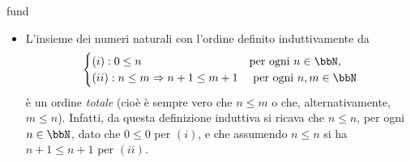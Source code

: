 \begin{hExamples}{fund}\leavevmode
	\begin{itemize}
		\item L'insieme dei numeri naturali con l'ordine definito induttivamente da
		      \[\begin{cases}
				      (i): 0\le n                         & \text{per ogni } n\in\bbN,   \\
				      (ii): n\le m \Rightarrow n+1\le m+1 & \text{ per ogni } n,m\in\bbN
			      \end{cases}\]
		      è un ordine \emph{totale} (cioè è sempre vero che \(n\le m\) o che, alternativamente, \(m\le n\)). Infatti, da questa definizione induttiva si ricava che \(n\le n\), per ogni	\(n\in\bbN\), dato che \(0\le 0\) per \((i)\), e che assumendo \(n\le n\) si ha \(n+1\le n+1\) per \((ii)\).


\end{itemize}
\end{hExamples}
